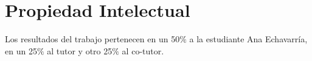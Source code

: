 \documentclass[11pt, oneside]{article}
\theoremstyle{definition}
\theoremstyle{remark}
\begin{document}

\section{Propiedad Intelectual}
Los resultados del trabajo pertenecen en un 50$\%$ a la estudiante Ana Echavarría, en un 25$\%$ al tutor y otro 25$\%$ al co-tutor.
\end{document}
